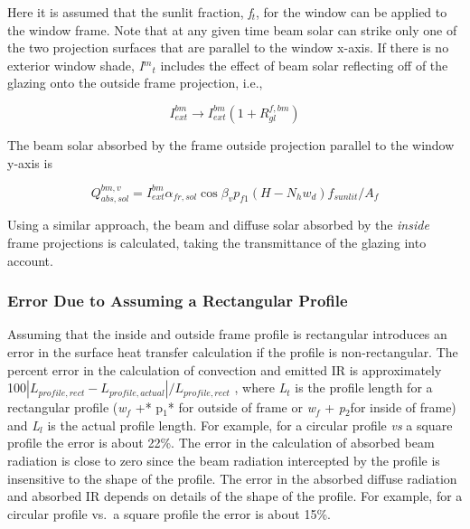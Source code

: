 Here it is assumed that the sunlit fraction, \emph{f\(_{t}\)}, for the window can be applied to the window frame. Note that at any given time beam solar can strike only one of the two projection surfaces that are parallel to the window x-axis. If there is no exterior window shade, \emph{I\(^{m}\)\(_{t}\)} includes the effect of beam solar reflecting off of the glazing onto the outside frame projection, i.e.,

\begin{equation}
I_{ext}^{bm} \to I_{ext}^{bm}\left( {1 + R_{gl}^{f,bm}} \right)
\end{equation}

The beam solar absorbed by the frame outside projection parallel to the window y-axis is

\begin{equation}
Q_{abs,sol}^{bm,v} = I_{ext}^{bm}{\alpha_{fr,sol}}\cos {\beta_v}{p_{f1}}\left( {H - {N_h}{w_d}} \right){f_{sunlit}}/{A_f}
\end{equation}

Using a similar approach, the beam and diffuse solar absorbed by the \emph{inside} frame projections is calculated, taking the transmittance of the glazing into account.

\subsubsection{Error Due to Assuming a Rectangular Profile}\label{error-due-to-assuming-a-rectangular-profile}

Assuming that the inside and outside frame profile is rectangular introduces an error in the surface heat transfer calculation if the profile is non-rectangular. The percent error in the calculation of convection and emitted IR is approximately 100\(\left| {{L_{profile,rect}} - {L_{profile,actual}}} \right|/{L_{profile,rect}}\) , where \emph{L\(_{t}\)} is the profile length for a rectangular profile (\emph{w\(_{f}\)} +* p\(_{1}\)* for outside of frame or \emph{w\(_{f}\)} + \emph{p\(_{2}\)}for inside of frame) and \emph{L\(_{l}\)} is the actual profile length. For example, for a circular profile \emph{vs} a square profile the error is about 22\%. The error in the calculation of absorbed beam radiation is close to zero since the beam radiation intercepted by the profile is insensitive to the shape of the profile. The error in the absorbed diffuse radiation and absorbed IR depends on details of the shape of the profile. For example, for a circular profile vs.~a square profile the error is about 15\%.

